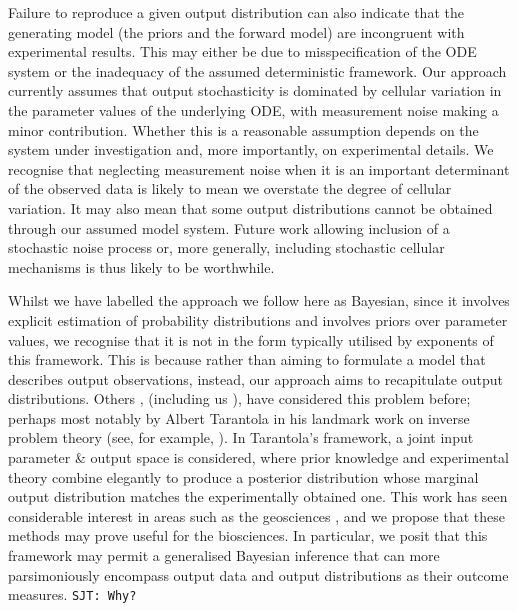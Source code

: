 Failure to reproduce a given output distribution can also indicate that the generating model (the priors and the forward model) are incongruent with experimental results. This may either be due to misspecification of the ODE system or the inadequacy of the assumed deterministic framework. Our approach currently assumes that output stochasticity is dominated by cellular variation in the parameter values of the underlying ODE, with measurement noise making a minor contribution. Whether this is a reasonable assumption depends on the system under investigation and, more importantly, on experimental details. We recognise that neglecting measurement noise when it is an important determinant of the observed data is likely to mean we overstate the degree of cellular variation. It may also mean that some output distributions cannot be obtained through our assumed model system. Future work allowing inclusion of a stochastic noise process or, more generally, including stochastic cellular mechanisms is thus likely to be worthwhile.

Whilst we have labelled the approach we follow here as Bayesian, since it involves explicit estimation of probability distributions and involves priors over parameter values, we recognise that it is not in the form typically utilised by exponents of this framework. This is because rather than aiming to formulate a model that describes output observations, instead, our approach aims to recapitulate output distributions. Others \cite{BJW-18}, (including us \cite{lambert2018inverse}), have considered this problem before; perhaps most notably by Albert Tarantola in his landmark work on inverse problem theory (see, for example, \cite{tarantola2005inverse}). In Tarantola's framework, a joint input parameter \& output space is considered, where prior knowledge and experimental theory combine elegantly to produce a posterior distribution whose marginal output distribution matches the experimentally obtained one. This work has seen considerable interest in areas such as the geosciences \cite{mosegaard1995monte,vukicevic2008analysis}, and we propose that these methods may prove useful for the biosciences. In particular, we posit that this framework may permit a generalised Bayesian inference that can more parsimoniously encompass output data and output distributions as their outcome measures. {\tt SJT: Why?}

